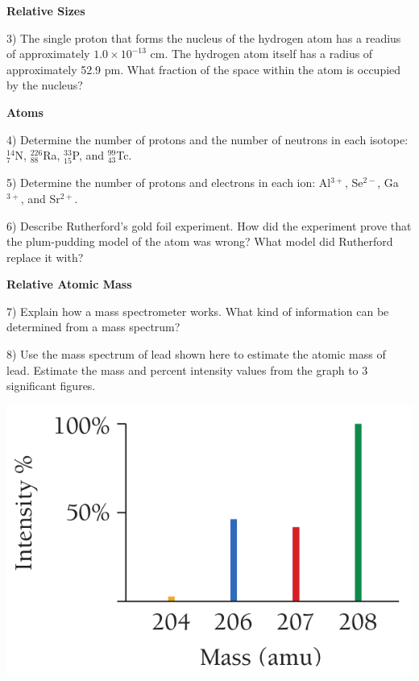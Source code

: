 \documentclass[12pt]{article}
\begin{document}
\textbf{Relative Sizes}

3) The single proton that forms the nucleus of the hydrogen atom has
a readius of approximately $1.0\times 10^{-13}$ cm. The hydrogen atom itself
has a radius of approximately 52.9 pm. What fraction of the space within
the atom is occupied by the nucleus?

\vspace{0.7in}

\textbf{Atoms}

4) Determine the number of protons and the number of neutrons in each isotope:
$^{14}_7$N, $^{226}_{88}$Ra, $^{33}_{15}$P, and $^{99}_{43}$Tc.

\vspace{0.4in}

5) Determine the number of protons and electrons in each ion: Al$^{3+}$, Se$^{2-}$,
Ga$^{3+}$, and Sr$^{2+}$.

\vspace{0.4in}

6) Describe Rutherford's gold foil experiment. How did the experiment prove
that the plum-pudding model of the atom was wrong? What model did Rutherford
replace it with?

\vspace{0.7in}

\textbf{Relative Atomic Mass}

7) Explain how a mass spectrometer works. What kind of information can be
determined from a mass spectrum?

\vspace{0.7in}

8) Use the mass spectrum of lead shown here to estimate the atomic mass of lead.
Estimate the mass and percent intensity values from the graph to 3 significant
figures.

\begin{center}
  \includegraphics[scale=0.3]{lead_amu}
\end{center}

\vfill
\end{document}
